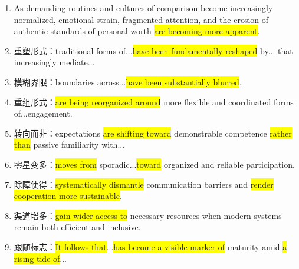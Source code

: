﻿\documentclass[lang=cn,11pt]{elegantbook}
\begin{document}
\begin{enumerate}
    \item As demanding routines and cultures of comparison become increasingly normalized, emotional strain, fragmented attention, and the erosion of authentic standards of personal worth \colorbox{yellow}{are becoming more apparent}.
    \item 重塑形式：traditional forms of...\colorbox{yellow}{have been fundamentally reshaped} by... that increasingly mediate...
    \item 模糊界限：boundaries across...\colorbox{yellow}{have been substantially blurred}.
    \item 重组形式：\colorbox{yellow}{are being reorganized around} more flexible and coordinated forms of...engagement.
    \item 转向而非：expectations \colorbox{yellow}{are shifting toward} demonstrable competence \colorbox{yellow}{rather than} passive familiarity with...
    \item 零星变多：\colorbox{yellow}{moves from} sporadic...\colorbox{yellow}{toward} organized and reliable participation.
    \item 除障使得：\colorbox{yellow}{systematically dismantle} communication barriers and \colorbox{yellow}{render cooperation more sustainable}.
    \item 渠道增多：\colorbox{yellow}{gain wider access to} necessary resources when modern systems remain both efficient and inclusive.
    \item 跟随标志：\colorbox{yellow}{It follows that}...\colorbox{yellow}{has become a visible marker of} maturity amid \colorbox{yellow}{a rising tide of}...
\end{enumerate}
\end{document}
